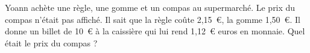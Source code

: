 Yoann achète une règle, une gomme et un compas au supermarché. Le prix du compas n'était pas affiché. Il sait que la règle coûte 2,15~\textgreek{\euro}, la gomme 1,50~\textgreek{\euro}. Il donne un billet de 10~\textgreek{\euro} à la caissière qui lui rend 1,12~\textgreek{\euro} euros en monnaie. Quel était le prix du compas ?